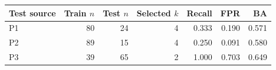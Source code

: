 \begin{tabular}{@{}lrrrrrr@{}}\toprule
Test source & Train $n$ & Test $n$ & Selected $k$ & Recall & FPR & BA \\
\midrule
P1 & 80 & 24 & 4 & 0.333 & 0.190 & 0.571 \\
P2 & 89 & 15 & 4 & 0.250 & 0.091 & 0.580 \\
P3 & 39 & 65 & 2 & 1.000 & 0.703 & 0.649 \\
\bottomrule\end{tabular}
